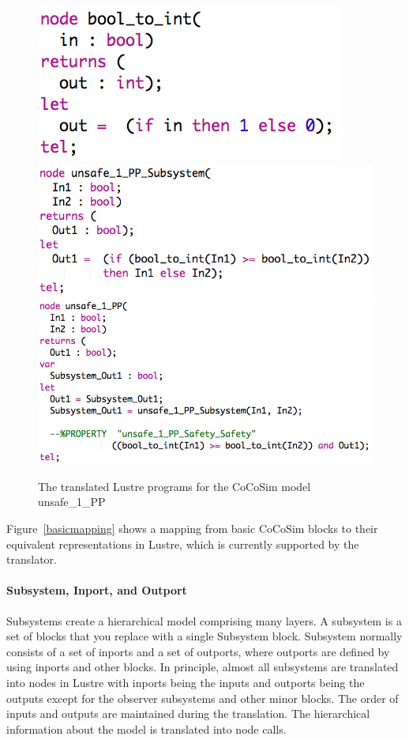 \documentclass{article}
\begin{document}
\begin{figure}[h]
\begin{center}
  \includegraphics[scale=0.4]{figures/lus0}
  \includegraphics[scale=0.4]{figures/lus1}
  \includegraphics[scale=0.4]{figures/lus2}  
    
\end{center}  
  \caption{The translated Lustre programs for the CoCoSim model unsafe\_1\_PP}
  \label{lus}
\end{figure}

Figure~\ref{basicmapping} shows a mapping from basic CoCoSim blocks to their equivalent representations in Lustre, which is currently supported by the translator. 

\paragraph{Subsystem, Inport, and Outport} 
Subsystems create a hierarchical model comprising many layers. 
A subsystem is a set of blocks that you replace with a single \textsf{Subsystem} block. 
Subsystem normally consists of a set of inports and a set of outports, where outports are
defined by using inports and other blocks. 
In principle, almost all subsystems are translated into nodes in Lustre with inports being the 
inputs and outports being the outputs except for the observer subsystems and other minor blocks. 
The order of inputs and outputs are maintained during the translation. 
The hierarchical information about the model is translated into node calls.
\end{document}
